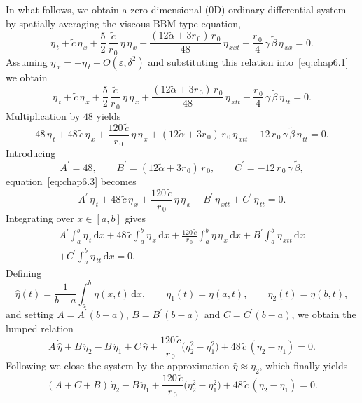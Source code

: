 \documentclass[alpha-refs, 12pt]{wiley-article}
\newcommand{\ud}{\mathrm{d}}
\newcommand{\eps}{\varepsilon}
\begin{document}
In what follows, we obtain a zero-dimensional (0D) ordinary differential system by spatially averaging the viscous BBM-type equation,
\begin{equation}\label{eq:chap6.1}
  \eta_{\,t}
  +\tilde{c}\,\eta_{\,x}
  +\frac{5}{2}\,\frac{\tilde{c}}{r_{\,0}}\,\eta\,\eta_{\,x}
  -\frac{(12\tilde{\alpha}+3r_{\,0})\,r_{\,0}}{48}\,\eta_{\,xxt}
  -\frac{r_{\,0}}{4}\,\gamma\,\tilde{\beta}\,\eta_{\,xx}=0.
\end{equation}
Assuming
\(\eta_{\,x}=-\eta_{\,t}+O(\eps,\delta^{2})\) and substituting this
relation into~\eqref{eq:chap6.1} we obtain
\begin{equation}\label{eq:chap6.2}
  \eta_{\,t}
  +\tilde{c}\,\eta_{\,x}
  +\frac{5}{2}\,\frac{\tilde{c}}{r_{\,0}}\,\eta\,\eta_{\,x}
  +\frac{(12\tilde{\alpha}+3r_{\,0})\,r_{\,0}}{48}\,\eta_{\,xtt}
  -\frac{r_{\,0}}{4}\,\gamma\,\tilde{\beta}\,\eta_{\,tt}=0.
\end{equation}
Multiplication by \(48\) yields
\begin{equation}\label{eq:chap6.3}
  48\,\eta_{\,t}
  +48\,\tilde{c}\,\eta_{\,x}
  +\frac{120\,\tilde{c}}{r_{\,0}}\,\eta\,\eta_{\,x}
  +(12\tilde{\alpha}+3r_{\,0})\,r_{\,0}\,\eta_{\,xtt}
  -12\,r_{\,0}\,\gamma\,\tilde{\beta}\,\eta_{\,tt}=0.
\end{equation}
Introducing
\[
  A^{\prime}=48,\qquad
  B^{\prime}=(12\tilde{\alpha}+3r_{\,0})\,r_{\,0},\qquad
  C^{\prime}=-12\,r_{\,0}\,\gamma\,\tilde{\beta},
\]
equation~\eqref{eq:chap6.3} becomes
\begin{equation}
  A^{\prime}\,\eta_{\,t}
  +48\,\tilde{c}\,\eta_{\,x}
  +\frac{120\,\tilde{c}}{r_{\,0}}\,\eta\,\eta_{\,x}
  +B^{\prime}\,\eta_{\,xtt}
  +C^{\prime}\,\eta_{\,tt}=0.
\end{equation}
Integrating over \(x\in[a,b]\) gives
\begin{multline}\label{eq:chap6.4}
  A^{\prime}\int_{a}^{b}\eta_{\,t}\,\ud x
  +48\,\tilde{c}\int_{a}^{b}\eta_{\,x}\,\ud x
  +\frac{120\,\tilde{c}}{r_{\,0}}\int_{a}^{b}\eta\,\eta_{\,x}\,\ud x
  +B^{\prime}\int_{a}^{b}\eta_{\,xtt}\,\ud x\\
  +C^{\prime}\int_{a}^{b}\eta_{\,tt}\,\ud x=0.
\end{multline}
Defining
\[
  \hat{\eta}(t)=\frac{1}{b-a}\int_{a}^{b}\eta(x,t)\,\ud x,\qquad
  \eta_{1}(t)=\eta(a,t),\qquad
  \eta_{2}(t)=\eta(b,t),
\]
and setting
\(A=A^{\prime}(b-a)\), \(B=B^{\prime}(b-a)\) and
\(C=C^{\prime}(b-a)\), we obtain the lumped relation
\begin{equation}\label{eq:chap6.5}
  A\,\dot{\hat{\eta}}
  +B\,\ddot{\eta}_{2}
  -B\,\ddot{\eta}_{1}
  +C\,\ddot{\hat{\eta}}
  +\frac{120\,\tilde{c}}{r_{\,0}}\bigl(\eta_{2}^{2}-\eta_{1}^{2}\bigr)
  +48\,\tilde{c}\,(\eta_{2}-\eta_{1})=0.
\end{equation}
Following \cite{Milisic2004} we close the system by the
approximation \(\hat{\eta}\approx\eta_{2}\), which finally yields
\begin{equation*}
  (A+C+B)\,\dot{\eta}_{2}
  -B\,\ddot{\eta}_{1}
  +\frac{120\,\tilde{c}}{r_{\,0}}\bigl(\eta_{2}^{2}-\eta_{1}^{2}\bigr)
  +48\,\tilde{c}\,(\eta_{2}-\eta_{1})=0.
\end{equation*}
\end{document}

